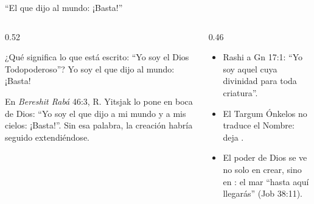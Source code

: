 \begin{frame}{``El que dijo al mundo: ¡Basta!''}
\begin{columns}[t,onlytextwidth]
\begin{column}{0.52\textwidth}
\begin{cita}[colback=dorado!10!papiro,colframe=dorado!80!azul]¿Qué significa lo que está escrito: ``Yo soy el Dios Todopoderoso''? Yo soy el que dijo al mundo: ¡Basta!\end{cita}
\begin{center}\scriptsize{}\end{center}
\scriptsize En \emph{Bereshit Rabá} 46:3, R. Yitsjak lo pone en boca de Dios: ``Yo soy el que dijo a mi mundo y a mis cielos: ¡Basta!''. Sin esa palabra, la creación habría seguido extendiéndose.
\end{column}
\begin{column}{0.46\textwidth}\small
\begin{itemize}
\item Rashi a Gn 17:1: ``Yo soy aquel cuya divinidad  para toda criatura''.
\item El Targum Ónkelos no traduce el Nombre: deja .
\item El poder de Dios se ve no solo en crear, sino en : el mar ``hasta aquí llegarás'' (Job 38:11).
\end{itemize}
\end{column}
\end{columns}
\end{frame}

